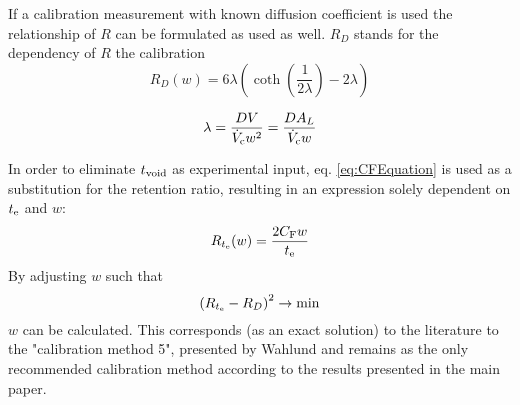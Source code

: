 If a calibration measurement with known diffusion coefficient is used the relationship of $R$ can be formulated as used 
as well. $R_D$ stands for the dependency of $R$ the calibration
\begin{equation}
R_D(w) = 6\lambda \left( \coth{\left( \frac{1}{2\lambda} \right) } - 2\lambda \right)
\end{equation}

\begin{equation}
\lambda = \frac{D V}{\dot{V}_\text{c} w^2} = \frac{D A_L}{\dot{V}_\text{c} w}
\end{equation}

In order to eliminate $t_\text{void}$ as experimental input, eq. \ref{eq:CFEquation} is used as a substitution for the 
retention ratio, resulting in an expression solely dependent on $t_\text{e}$ and $w$:
\begin{equation}
R_{t_\text{e}}(w) = \frac{2 C_\text{F} w}{t_\text{e}}
\end{equation}
By adjusting $w$ such that \[\left( R_{t_\text{e}} - R_D \right)^2 \rightarrow \min\]
$w$ can be calculated. This corresponds (as an exact solution) to the literature to the "calibration method 5", 
presented by Wahlund  and remains as the only recommended calibration method according to the 
results presented in the main paper.